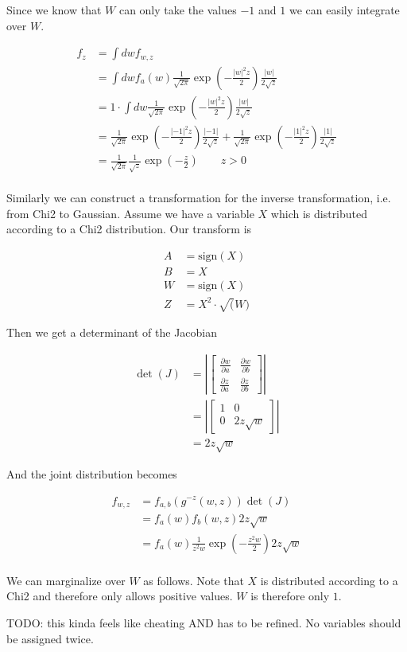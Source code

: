 Since we know that $W$ can only take the values $-1$ and $1$ we can easily integrate over $W$. 

\begin{align*}
	f_{z} &= \int dw f_{w,z} \\
	&= \int dw f_a(w) \frac{1}{\sqrt{2\pi}} \exp\left(-\frac{|w|^2 z}{2}\right) \frac{|w|}{2\sqrt{z}} \\
	&= 1 \cdot  \int dw \frac{1}{\sqrt{2\pi}} \exp\left(-\frac{|w|^2 z}{2}\right) \frac{|w|}{2\sqrt{z}} \\
	&= \frac{1}{\sqrt{2\pi}} \exp\left(-\frac{|-1|^2 z}{2}\right) \frac{|-1|}{2\sqrt{z}}  + \frac{1}{\sqrt{2\pi}} \exp\left(-\frac{|1|^2 z}{2}\right) \frac{|1|}{2\sqrt{z}} \\
	&= \frac{1}{\sqrt{2\pi}} \frac{1}{\sqrt{z}} \exp\left(-\frac{z}{2}\right) \qquad z > 0\\
\end{align*}

Similarly we can construct a transformation for the inverse transformation, i.e. from Chi2 to Gaussian. Assume we have a variable $X$ which is distributed according to a Chi2 distribution. Our transform is

\begin{align*}
	A &= \text{sign}(X) \\
	B &= X \\
	W &= \text{sign}(X) \\
	Z &= X^2 \cdot \sqrt(W)
\end{align*}

Then we get a determinant of the Jacobian

\begin{align*}
	\det(J) &= \left|\begin{bmatrix}
			\frac{\partial w}{\partial a} & \frac{\partial w}{\partial b} \\
			\frac{\partial z}{\partial a} & \frac{\partial z}{\partial b}
			\end{bmatrix}\right| \\
			&= \left|\begin{bmatrix}
			1 & 0 \\
			0 & 2z \sqrt{w}
			\end{bmatrix}\right| \\
			&= 2z \sqrt{w}
\end{align*}

And the joint distribution becomes 

\begin{align*}
	f_{w,z} &=  f_{a,b}(g^{-z}(w,z)) \det(J) \\
	&= f_a(w) f_b(w,z) 2z \sqrt{w} \\
	&= f_a(w) \frac{1}{z^2 w} \exp \left(-\frac{z^2 w}{2}\right) 2z \sqrt{w} \\
\end{align*}

We can marginalize over $W$ as follows. Note that $X$ is distributed according to a Chi2 and therefore only allows positive values. $W$ is therefore only $1$. 


TODO: this kinda feels like cheating AND has to be refined. No variables should be assigned twice. 